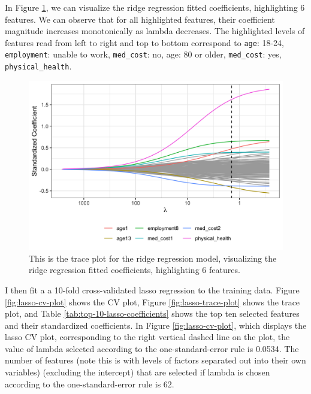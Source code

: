 \documentclass[
]{article}
\begin{document}
In Figure \ref{fig:ridge-trace-plot}, we can visualize the ridge regression fitted coefficients, highlighting 6 features. We can observe that for all highlighted features, their coefficient magnitude increases monotonically as lambda decreases. The highlighted levels of features read from left to right and top to bottom correspond to \texttt{age}: 18-24, \texttt{employment}: unable to work, \texttt{med\_cost}: no, age: 80 or older, \texttt{med\_cost}: yes, \texttt{physical\_health}.

\begin{figure}[H]

{\centering \includegraphics[width=0.8\linewidth]{../results/ridge-trace-plot} 

}

\caption{This is the trace plot for the ridge regression model, visualizing the ridge regression fitted coefficients, highlighting 6 features.}\label{fig:ridge-trace-plot}
\end{figure}

I then fit a a 10-fold cross-validated lasso regression to the training data. Figure \ref{fig:lasso-cv-plot} shows the CV plot, Figure \ref{fig:lasso-trace-plot} shows the trace plot, and Table \ref{tab:top-10-lasso-coefficients} shows the top ten selected features and their standardized coefficients. In Figure \ref{fig:lasso-cv-plot}, which displays the lasso CV plot, corresponding to the right vertical dashed line on the plot, the value of lambda selected according to the one-standard-error rule is 0.0534. The number of features (note this is with levels of factors separated out into their own variables) (excluding the intercept) that are selected if lambda is chosen according to the one-standard-error rule is 62.
\end{document}
